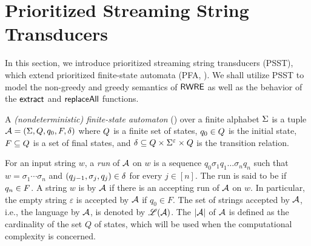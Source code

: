 
\section{Prioritized Streaming String Transducers}  \label{sect:psst}

In this section, we introduce prioritized streaming string transducers (PSST), which extend prioritized finite-state automata (PFA,  \cite{BM17}). We shall utilize PSST to model  the non-greedy and greedy semantics of ${\sf RWRE}$ as well as the behavior of the $\mathsf{extract}$ and $\mathsf{replaceAll}$ functions.



\begin{definition} \label{def:nfa}
	A \emph{(nondeterministic) finite-state automaton}
	(\FA{}) over a finite alphabet $\Sigma$ is a tuple $\mathcal{A} =
	(\Sigma, Q, q_0, F, \delta)$ where 
	$Q$ is a finite set of 
	states, $q_0\in Q$ is
	the initial state, $F\subseteq Q$ is a set of final states, and 
	$\delta\subseteq Q \times 
	\Sigma^\varepsilon \times  Q$ is the
	transition relation. 
\end{definition}

For an input string $w$, a \emph{run} of $\mathcal{A}$ on $w$
is a sequence $q_0 \sigma_1 q_1 \ldots \sigma_n q_n$ such that $w = \sigma_1 \cdots \sigma_n$ and $(q_{j-1}, \sigma_{j}, q_{j}) \in
\delta$ for every $j \in [n]$.
The run is said to be  if $q_n \in F$.
A string $w$ is  by $\mathcal{A}$ if there is an accepting run of
$\mathcal{A}$ on $w$. In particular, the empty string $\varepsilon$ is accepted by $\mathcal{A}$ if $q_0 \in F$. The set of strings accepted by $\mathcal{A}$, i.e., the language  by $\mathcal{A}$, is denoted by $\mathscr{L}(\mathcal{A})$.
The  $|\mathcal{A}|$ of $\mathcal{A}$ is defined as the cardinality of the set $Q$ of states, which will be 
used when the computational complexity is concerned.

